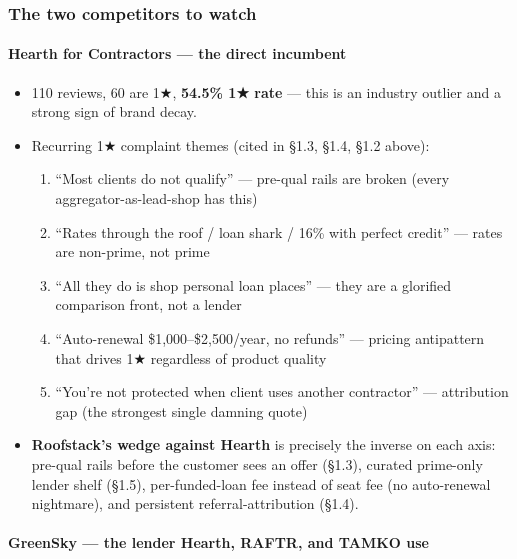 \documentclass[
  10pt,
]{article}
\providecommand{\tightlist}{%
  \setlength{\itemsep}{0pt}\setlength{\parskip}{0pt}}
\begin{document}
\hypertarget{the-two-competitors-to-watch}{%
\subsubsection{The two competitors to watch}\label{the-two-competitors-to-watch}}

\hypertarget{hearth-for-contractors-the-direct-incumbent}{%
\paragraph{\texorpdfstring{\textbf{Hearth for Contractors} --- the direct
incumbent}{Hearth for Contractors --- the direct incumbent}}\label{hearth-for-contractors-the-direct-incumbent}}

\begin{itemize}
\tightlist
\item
  110 reviews, 60 are 1★, \textbf{54.5\% 1★ rate} --- this is an industry outlier and a strong sign
  of brand decay.
\item
  Recurring 1★ complaint themes (cited in §1.3, §1.4, §1.2 above):

  \begin{enumerate}
  \def\labelenumi{\arabic{enumi}.}
  \tightlist
  \item
    ``Most clients do not qualify'' --- pre-qual rails are broken (every aggregator-as-lead-shop has
    this)
  \item
    ``Rates through the roof / loan shark / 16\% with perfect credit'' --- rates are non-prime, not
    prime
  \item
    ``All they do is shop personal loan places'' --- they are a glorified comparison front, not a
    lender
  \item
    ``Auto-renewal \$1,000--\$2,500/year, no refunds'' --- pricing antipattern that drives 1★
    regardless of product quality
  \item
    ``You're not protected when client uses another contractor'' --- attribution gap (the strongest
    single damning quote)
  \end{enumerate}
\item
  \textbf{Roofstack's wedge against Hearth} is precisely the inverse on each axis: pre-qual rails
  before the customer sees an offer (§1.3), curated prime-only lender shelf (§1.5), per-funded-loan
  fee instead of seat fee (no auto-renewal nightmare), and persistent referral-attribution (§1.4).
\end{itemize}

\hypertarget{greensky-the-lender-hearth-raftr-and-tamko-use}{%
\paragraph{\texorpdfstring{\textbf{GreenSky} --- the lender Hearth, RAFTR, and TAMKO
use}{GreenSky --- the lender Hearth, RAFTR, and TAMKO use}}\label{greensky-the-lender-hearth-raftr-and-tamko-use}}
\end{document}

